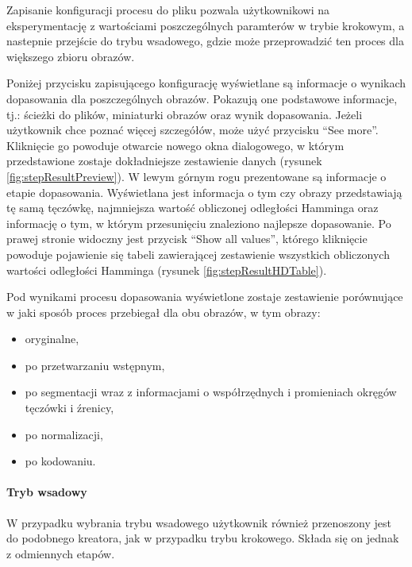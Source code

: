 \documentclass[10pt,polish,a4paper,oneside]{ppfcmthesis}
\begin{document}
Zapisanie konfiguracji procesu do pliku pozwala użytkownikowi na eksperymentację z wartościami poszczególnych
paramterów w trybie krokowym, a nastepnie przejście do trybu wsadowego, gdzie może przeprowadzi\'c ten proces
dla większego zbioru obrazów.\newline

Poniżej przycisku zapisującego konfigurację wyświetlane są informacje o wynikach dopasowania
dla poszczególnych obrazów. Pokazują one podstawowe informacje, tj.: ścieżki do plików,
miniaturki obrazów oraz wynik dopasowania. Jeżeli użytkownik chce pozna\'c więcej szczegółów, może
uży\'c przycisku ``See more''. Kliknięcie go powoduje otwarcie nowego okna dialogowego, w którym
przedstawione zostaje dokładniejsze zestawienie danych (rysunek \ref{fig:stepResultPreview}).
W lewym górnym rogu prezentowane są informacje o etapie dopasowania. Wyświetlana jest informacja
o tym czy obrazy przedstawiają tę samą tęczówkę, najmniejsza wartoś\'c obliczonej odległości Hamminga
oraz informację o tym, w którym przesunięciu znaleziono najlepsze dopasowanie.
Po prawej stronie widoczny jest przycisk ``Show all values'', którego kliknięcie powoduje
pojawienie się tabeli zawierającej zestawienie wszystkich obliczonych wartości odległości Hamminga
(rysunek \ref{fig:stepResultHDTable}).

Pod wynikami procesu dopasowania wyświetlone zostaje zestawienie porównujące w jaki sposób
proces przebiegał dla obu obrazów, w tym obrazy:

\begin{itemize}
  \item oryginalne,
  \item po przetwarzaniu wstępnym,
  \item po segmentacji wraz z informacjami o współrzędnych i promieniach okręgów tęczówki i \'zrenicy,
  \item po normalizacji,
  \item po kodowaniu.
\end{itemize}

\paragraph{Tryb wsadowy\newline}

W przypadku wybrania trybu wsadowego użytkownik również przenoszony jest do podobnego kreatora,
jak w przypadku trybu krokowego. Składa się on jednak z odmiennych etapów.\newline
\end{document}
